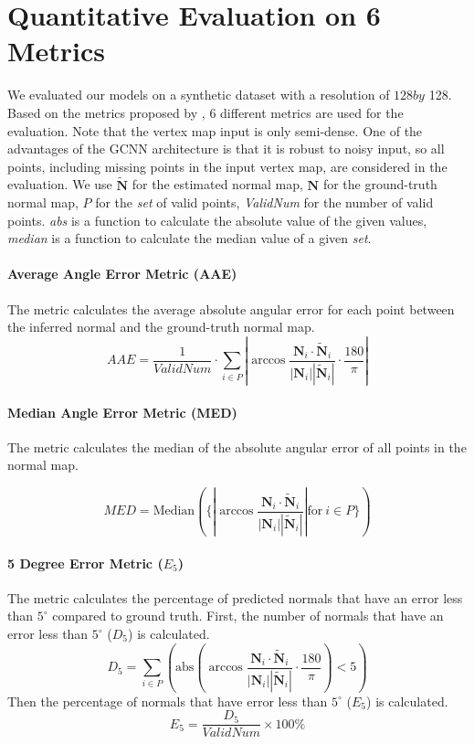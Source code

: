 \section{Quantitative Evaluation on 6 Metrics}
We evaluated our models on a synthetic dataset with a resolution of $ 128 by $ 128. 
Based on the metrics proposed by \cite{geometry_based_solution}, 6 different metrics are used for the evaluation. Note that the vertex map input is only semi-dense. One of the advantages of the GCNN architecture is that it is robust to noisy input, so all points, including missing points in the input vertex map, are considered in the evaluation. We use $\tilde{\textbf{N}}$ for the estimated normal map, $ \textbf{N} $ for the ground-truth normal map, $ P $ for the \textit{set} of valid points, \textit{ValidNum} for the number of valid points. \textit{abs} is a function to calculate the absolute value of the given values, \textit{median} is a function to calculate the median value of a given \textit{set}.



\paragraph{Average Angle Error Metric (AAE)}
The metric calculates the average absolute angular error for each point between the inferred normal and the ground-truth normal map.
\[ 
AAE = \frac
{1}
{ValidNum} \cdot \sum_{i\in P}  \left|   \arccos \frac{\textbf{N}_{i}\cdot \tilde{\textbf{N}}_{i}} {| \textbf{N}_{i} |  |\tilde{\textbf{N}}_{i}|  } \cdot  \frac{180}{\pi}   \right| 
\]

\paragraph{Median Angle Error Metric (MED)}
The metric calculates the median of the absolute angular error of all points in the normal map.

\[ 
MED = 
\text{Median}   \left( \Bigg\{ \left|\arccos \frac{\textbf{N}_{i}\cdot \tilde{\textbf{N}}_{i}} {| \textbf{N}_{i} |  |\tilde{\textbf{N}}_{i}|  } \right| \text{for}\ i \in P   \Bigg\}\right)
\]

\paragraph{5 Degree Error Metric ($ E_5 $)}
The metric calculates the percentage of predicted normals that have an error less than $ 5^\circ $ compared to ground truth. First, the number of normals that have an error less than $ 5^\circ $ ($ D_5 $) is calculated.
\[
D_5 = \sum_{i\in P} \left( \text{abs}\left(   \arccos \frac{\textbf{N}_{i}\cdot \tilde{\textbf{N}}_{i}} {| \textbf{N}_{i} |  |\tilde{\textbf{N}}_{i}|  } \cdot  \frac{180}{\pi}   \right) < 5 \right)
\]
Then the percentage of normals that have error less than $ 5^\circ $ ($ E_5 $) is calculated.
\[ 
E_5 = \frac{D_5}{ValidNum}\times 100\%
\]


